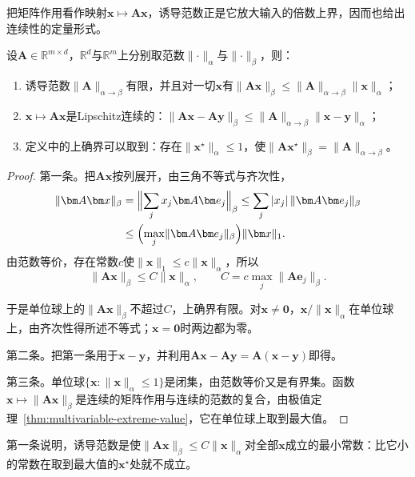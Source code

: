 把矩阵作用看作映射$\bm x\mapsto\bm A\bm x$，诱导范数正是它放大输入的倍数上界，因而也给出连续性的定量形式。
\begin{theorem}[线性作用的连续性]
\label{thm:ls-linear-map-continuity}
设$\bm A\in\mathbb R^{m\times d}$，$\mathbb R^d$与$\mathbb R^m$上分别取范数$\lVert\cdot\rVert_\alpha$与$\lVert\cdot\rVert_\beta$，则：
\begin{enumerate}
 \item 诱导范数$\lVert\bm A\rVert_{\alpha\to\beta}$有限，并且对一切$\bm x$有$\lVert\bm A\bm x\rVert_\beta\leq\lVert\bm A\rVert_{\alpha\to\beta}\lVert\bm x\rVert_\alpha$；
 \item $\bm x\mapsto\bm A\bm x$是Lipschitz连续的：$\lVert\bm A\bm x-\bm A\bm y\rVert_\beta\leq\lVert\bm A\rVert_{\alpha\to\beta}\lVert\bm x-\bm y\rVert_\alpha$；
 \item 定义中的上确界可以取到：存在$\lVert\bm x^\star\rVert_\alpha\leq1$，使$\lVert\bm A\bm x^\star\rVert_\beta=\lVert\bm A\rVert_{\alpha\to\beta}$。
\end{enumerate}
\end{theorem}
\begin{proof}
第一条。把$\bm A\bm x$按列展开，由三角不等式与齐次性，
\[
 \begin{aligned}
 \lVert\bm A\bm x\rVert_\beta
 &=\Bigl\lVert\sum_jx_j\bm A\bm e_j\Bigr\rVert_\beta
 \leq\sum_j|x_j|\,\lVert\bm A\bm e_j\rVert_\beta\\
 &\leq\Bigl(\max_j\lVert\bm A\bm e_j\rVert_\beta\Bigr)\lVert\bm x\rVert_1 .
 \end{aligned}
\]
由范数等价，存在常数$c$使$\lVert\bm x\rVert_1\leq c\lVert\bm x\rVert_\alpha$，所以
\[
 \lVert\bm A\bm x\rVert_\beta\leq C\lVert\bm x\rVert_\alpha,\qquad C=c\max_j\lVert\bm A\bm e_j\rVert_\beta.
\]

于是单位球上的$\lVert\bm A\bm x\rVert_\beta$不超过$C$，上确界有限。对$\bm x\neq\bm0$，$\bm x/\lVert\bm x\rVert_\alpha$在单位球上，由齐次性得所述不等式；$\bm x=\bm0$时两边都为零。

第二条。把第一条用于$\bm x-\bm y$，并利用$\bm A\bm x-\bm A\bm y=\bm A(\bm x-\bm y)$即得。

第三条。单位球$\{\bm x:\lVert\bm x\rVert_\alpha\leq1\}$是闭集，由范数等价又是有界集。函数$\bm x\mapsto\lVert\bm A\bm x\rVert_\beta$是连续的矩阵作用与连续的范数的复合，由极值定理~\ref{thm:multivariable-extreme-value}，它在单位球上取到最大值。
\end{proof}
第一条说明，诱导范数是使$\lVert\bm A\bm x\rVert_\beta\leq C\lVert\bm x\rVert_\alpha$对全部$\bm x$成立的最小常数：比它小的常数在取到最大值的$\bm x^\star$处就不成立。

